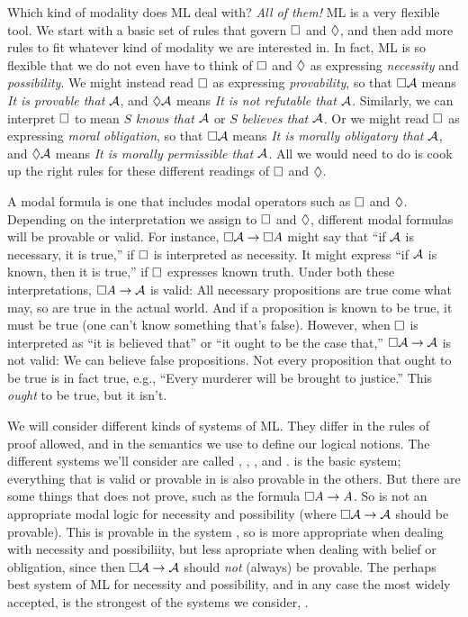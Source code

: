 Which kind of modality does ML deal with? \emph{All of them!} ML is a very flexible tool. We start with a basic set of rules that govern $\Box$ and $\Diamond$, and then add more rules to fit whatever kind of modality we are interested in. In fact, ML is so flexible that we do not even have to think of $\Box$ and $\Diamond$ as expressing \emph{necessity} and \emph{possibility}. We might instead read $\Box$ as expressing \emph{provability}, so that $\Box\mathcal{A}$ means \emph{It is provable that} $\mathcal{A}$, and $\Diamond\mathcal{A}$ means \emph{It is not refutable that} $\mathcal{A}$. Similarly, we can interpret $\Box$ to mean $S$ \emph{knows that $\mathcal{A}$} or $S$ \emph{believes that $\mathcal{A}$}. Or we might read $\Box$ as expressing \emph{moral obligation}, so that $\Box \mathcal{A}$ means \emph{It is morally obligatory that} $\mathcal{A}$, and $\Diamond \mathcal{A}$ means \emph{It is morally permissible that} $\mathcal{A}$. All we would need to do is cook up the right rules for these different readings of $\Box$ and $\Diamond$.

A modal formula is one that includes modal operators such as $\Box$ and $\Diamond$. Depending on the interpretation we assign to $\Box$ and $\Diamond$, different modal formulas will be provable or valid. For instance, $\Box \mathcal{A} \rightarrow \Box{A}$ might say that ``if $\mathcal{A}$ is necessary, it is true,'' if $\Box$ is interpreted as necessity. It might express ``if $\mathcal{A}$ is known, then it is true,'' if $\Box$ expresses known truth. Under both these interpretations, $\Box{A} \rightarrow \mathcal{A}$ is valid: All necessary propositions are true come what may, so are true in the actual world. And if a proposition is known to be true, it must be true (one can't know something that's false). However, when $\Box$ is interpreted as ``it is believed that'' or ``it ought to be the case that,'' $\Box\mathcal{A} \rightarrow \mathcal{A}$ is not valid: We can believe false propositions. Not every proposition that ought to be true is in fact true, e.g., ``Every murderer will be brought to justice.'' This \emph{ought} to be true, but it isn't. 

We will consider different kinds of systems of ML. They differ in the rules of proof allowed, and in the semantics we use to define our logical notions. The different systems we'll consider are called \mlK, \mlT, \mlSfour, and \mlSfive. \mlK{} is the basic system; everything that is valid or provable in \mlK{} is also provable in the others. But there are some things that \mlK{} does not prove, such as the formula $\Box A \rightarrow A$. So \mlK{} is not an appropriate modal logic for necessity and possibility (where $\Box\mathcal{A} \rightarrow \mathcal{A}$ should be provable). This is provable in the system \mlT, so \mlT{} is more appropriate when dealing with necessity and possibiliity, but less apropriate when dealing with belief or obligation, since then $\Box\mathcal{A} \rightarrow \mathcal{A}$ should \emph{not} (always) be provable. The perhaps best system of ML for necessity and possibility, and in any case the most widely accepted, is the strongest of the systems we consider, \mlSfive.

